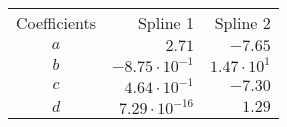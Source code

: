 \begin{tabular}{crr}
    \toprule
    Coefficients & Spline 1 & Spline 2 \\ \otoprule
    $a$ & $2.71$ & $-7.65$ \\
    $b$ & $-8.75 \cdot 10^{-1}$ & $1.47 \cdot 10^{1}$ \\
    $c$ & $4.64 \cdot 10^{-1}$ & $-7.30$ \\
    $d$ & $7.29 \cdot 10^{-16}$ & $1.29$ \\
    \bottomrule
\end{tabular}
